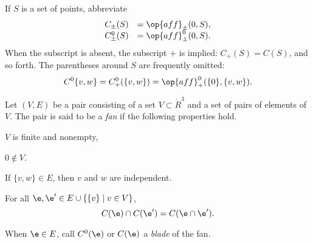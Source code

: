

If $S$ is a set of points,
abbreviate
  $$
  \begin{array}{lll}
  C_\pm(S) &= \op{aff}_\pm(0,S),\\
  C^0_\pm(S) &= \op{aff}^0_\pm(0,S).\\
  \end{array}
  $$
When the subscript is absent, the subscript $+$ is implied: $C_+(S) = C(S)$, and
so forth.  The parentheses around $S$ are frequently omitted: 
$$C^0\{v,w\}=C^0_+(\{v,w\}) = \op{aff}^0_+(\{0\},\{v,w\}).$$

\begin{definition}[fan]  
Let $(V,E)$ be a pair consisting of a set $V\subset \ring{R}^3$ and a set of pairs of elements of $V$.  The pair is said to be
a {\it fan\/} if the following properties hold.
    \begin{nomerate}
    \item {} $V$ is finite and  nonempty,
    \item {} $0\not\in V$.
    \item {} If $\{v,w\} \in E$, then $v$ and $w$ are independent.
    \item {}
    For all $\e ,\e '\in E \cup \{\{v\}\mid v\in V\}$, 
 $$C(\e )\cap C(\e ') = C(\e \cap \e ').$$
    \end{nomerate}
When $\e\in E$, call $C^0(\e)$ or $C(\e)$ a {\it blade\/} of the fan.
\end{definition}
%
%
%
%
%
%
\bigskip\hbox{~}\bigskip


